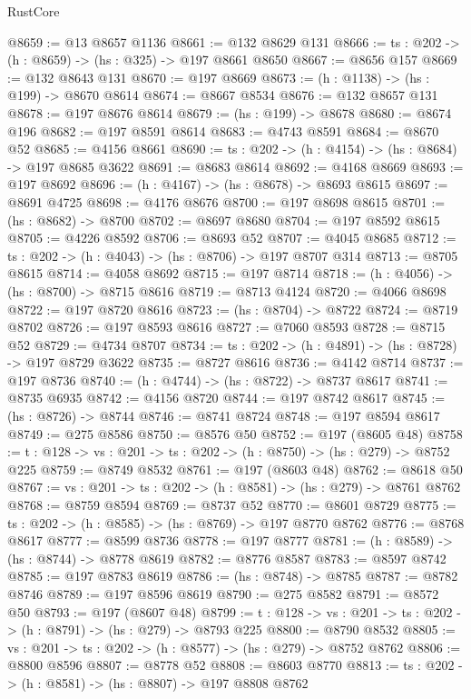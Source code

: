 \begin{lexlean}{RustCore}
\begin{coremodule}
@8659 := @13 @8657 @1136
@8661 := @132 @8629 @131
@8666 := {ts : @202} -> (h : @8659) -> (hs : @325) -> @197 @8661 @8650
@8667 := @8656 @157
@8669 := @132 @8643 @131
@8670 := @197 @8669
@8673 := (h : @1138) -> (hs : @199) -> @8670 @8614
@8674 := @8667 @8534
@8676 := @132 @8657 @131
@8678 := @197 @8676 @8614
@8679 := (hs : @199) -> @8678
@8680 := @8674 @196
@8682 := @197 @8591 @8614
@8683 := @4743 @8591
@8684 := @8670 @52
@8685 := @4156 @8661
@8690 := {ts : @202} -> (h : @4154) -> (hs : @8684) -> @197 @8685 @3622
@8691 := @8683 @8614
@8692 := @4168 @8669
@8693 := @197 @8692
@8696 := (h : @4167) -> (hs : @8678) -> @8693 @8615
@8697 := @8691 @4725
@8698 := @4176 @8676
@8700 := @197 @8698 @8615
@8701 := (hs : @8682) -> @8700
@8702 := @8697 @8680
@8704 := @197 @8592 @8615
@8705 := @4226 @8592
@8706 := @8693 @52
@8707 := @4045 @8685
@8712 := {ts : @202} -> (h : @4043) -> (hs : @8706) -> @197 @8707 @314
@8713 := @8705 @8615
@8714 := @4058 @8692
@8715 := @197 @8714
@8718 := (h : @4056) -> (hs : @8700) -> @8715 @8616
@8719 := @8713 @4124
@8720 := @4066 @8698
@8722 := @197 @8720 @8616
@8723 := (hs : @8704) -> @8722
@8724 := @8719 @8702
@8726 := @197 @8593 @8616
@8727 := @7060 @8593
@8728 := @8715 @52
@8729 := @4734 @8707
@8734 := {ts : @202} -> (h : @4891) -> (hs : @8728) -> @197 @8729 @3622
@8735 := @8727 @8616
@8736 := @4142 @8714
@8737 := @197 @8736
@8740 := (h : @4744) -> (hs : @8722) -> @8737 @8617
@8741 := @8735 @6935
@8742 := @4156 @8720
@8744 := @197 @8742 @8617
@8745 := (hs : @8726) -> @8744
@8746 := @8741 @8724
@8748 := @197 @8594 @8617
@8749 := @275 @8586
@8750 := @8576 @50
@8752 := @197 (@8605 @48)
@8758 := {t : @128} -> {vs : @201} -> {ts : @202} -> (h : @8750) -> (hs : @279) -> @8752 @225
@8759 := @8749 @8532
@8761 := @197 (@8603 @48)
@8762 := @8618 @50
@8767 := {vs : @201} -> {ts : @202} -> (h : @8581) -> (hs : @279) -> @8761 @8762
@8768 := @8759 @8594
@8769 := @8737 @52
@8770 := @8601 @8729
@8775 := {ts : @202} -> (h : @8585) -> (hs : @8769) -> @197 @8770 @8762
@8776 := @8768 @8617
@8777 := @8599 @8736
@8778 := @197 @8777
@8781 := (h : @8589) -> (hs : @8744) -> @8778 @8619
@8782 := @8776 @8587
@8783 := @8597 @8742
@8785 := @197 @8783 @8619
@8786 := (hs : @8748) -> @8785
@8787 := @8782 @8746
@8789 := @197 @8596 @8619
@8790 := @275 @8582
@8791 := @8572 @50
@8793 := @197 (@8607 @48)
@8799 := {t : @128} -> {vs : @201} -> {ts : @202} -> (h : @8791) -> (hs : @279) -> @8793 @225
@8800 := @8790 @8532
@8805 := {vs : @201} -> {ts : @202} -> (h : @8577) -> (hs : @279) -> @8752 @8762
@8806 := @8800 @8596
@8807 := @8778 @52
@8808 := @8603 @8770
@8813 := {ts : @202} -> (h : @8581) -> (hs : @8807) -> @197 @8808 @8762

\end{coremodule}
\end{lexlean}
